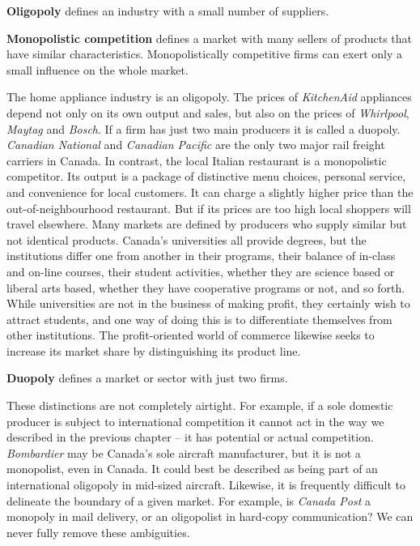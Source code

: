 \begin{DefBox}
\textbf{Oligopoly} defines an industry with a small number of suppliers.

\textbf{Monopolistic competition} defines a market with many sellers of products that have similar characteristics. Monopolistically competitive firms can exert only a small influence on the whole market.
\end{DefBox}

The home appliance industry is an oligopoly. The prices of \textit{KitchenAid} appliances depend not only on its own output and sales, but also on the prices of \textit{Whirlpool}, \textit{Maytag} and \textit{Bosch}. If a firm has just two main producers it is called a duopoly. \textit{Canadian National} and \textit{Canadian Pacific} are the only two major rail freight carriers in Canada. In contrast, the local Italian restaurant is a monopolistic competitor. Its output is a package of distinctive menu choices, personal service, and convenience for local customers. It can charge a slightly higher price than the out-of-neighbourhood restaurant. But if its prices are too high local shoppers will travel elsewhere. Many markets are defined by producers who supply similar but not identical products. Canada's universities all provide degrees, but the institutions differ one from another in their programs, their balance of in-class and on-line courses, their student activities, whether they are science based or liberal arts based, whether they have cooperative programs or not, and so forth. While universities are not in the business of making profit, they certainly wish to attract students, and one way of doing this is to differentiate themselves from other institutions. The profit-oriented world of commerce likewise seeks to increase its market share by distinguishing its product line.

\begin{DefBox}
\textbf{Duopoly} defines a market or sector with just two firms.
\end{DefBox}

These distinctions are not completely airtight. For example, if a sole domestic producer is subject to international competition it cannot act in the way we described in the previous chapter -- it has potential or actual competition. \textit{Bombardier} may be Canada's sole aircraft manufacturer, but it is not a monopolist, even in Canada. It could best be described as being part of an international oligopoly in mid-sized aircraft. Likewise, it is frequently difficult to delineate the boundary of a given market. For example, is \textit{Canada Post} a monopoly in mail delivery, or an oligopolist in hard-copy communication? We can never fully remove these ambiguities.


